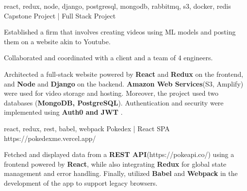 


\begin{cventries}



  \cventry
    {react, redux, node, django, postgresql, mongodb, rabbitmq, s3, docker, redis } %
    {Capstone Project | Full Stack Project}  %
    {} %
    {} 
    { 
      \begin{cvitems} %
        \item {Established a firm that involves creating videos using ML models and posting them on a website akin to Youtube.} 
        \item {Collaborated and coordinated with a client and a team of 4 engineers.} 
        \item {Architected a full-stack website powered by \textbf{React} and \textbf{Redux}  on the frontend, and \textbf{Node} and \textbf{Django} on the backend. \textbf{Amazon Web Services}(S3, Amplify) were used for video storage and hosting. Moreover, the project used two databases (\textbf{MongoDB, PostgreSQL}). Authentication and security were implemented using \textbf{Auth0 and JWT} .}    
      \end{cvitems}
    }

  \cventry
    {react, redux, rest, babel, webpack} %
    {Pokedex | React SPA}  %
    {https://pokedexme.vercel.app/} %
    {} 
    {
      \begin{cvitems} %
        \item {Fetched and displayed data from a \textbf{REST API}(https://pokeapi.co/) using a frontend powered by \textbf{React}, while also integrating \textbf{Redux}  for global state management and error handling. Finally, utilized \textbf{Babel} and \textbf{Webpack}  in the development of the app to support legacy browsers.}   
      \end{cvitems}
    }


\end{cventries}
